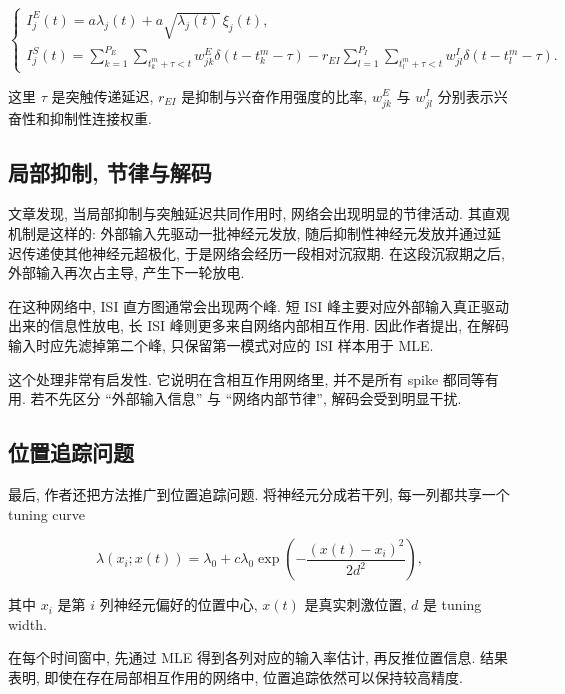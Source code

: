 \documentclass[oneside]{ctexart}
\begin{document}
\begin{equation}
    \begin{cases}
        I_j^{E}(t)=a\lambda_j(t)+a\sqrt{\lambda_j(t)}\,\xi_j(t), \\[1.2ex]
        I_j^{S}(t)=
        \sum\limits_{k=1}^{P_E}\sum\limits_{t_k^m+\tau<t}w_{jk}^{E}\delta(t-t_k^m-\tau)
        -
        r_{EI}\sum\limits_{l=1}^{P_I}\sum\limits_{t_l^m+\tau<t}w_{jl}^{I}\delta(t-t_l^m-\tau).
    \end{cases}
\end{equation}

这里 $\tau$ 是突触传递延迟, $r_{EI}$ 是抑制与兴奋作用强度的比率, $w_{jk}^{E}$ 与 $w_{jl}^{I}$ 分别表示兴奋性和抑制性连接权重.

\subsection{局部抑制, 节律与解码}

文章发现, 当局部抑制与突触延迟共同作用时, 网络会出现明显的节律活动. 其直观机制是这样的: 外部输入先驱动一批神经元发放, 随后抑制性神经元发放并通过延迟传递使其他神经元超极化, 于是网络会经历一段相对沉寂期. 在这段沉寂期之后, 外部输入再次占主导, 产生下一轮放电.

在这种网络中, ISI 直方图通常会出现两个峰. 短 ISI 峰主要对应外部输入真正驱动出来的信息性放电, 长 ISI 峰则更多来自网络内部相互作用. 因此作者提出, 在解码输入时应先滤掉第二个峰, 只保留第一模式对应的 ISI 样本用于 MLE.

这个处理非常有启发性. 它说明在含相互作用网络里, 并不是所有 spike 都同等有用. 若不先区分 ``外部输入信息'' 与 ``网络内部节律'', 解码会受到明显干扰.

\subsection{位置追踪问题}

最后, 作者还把方法推广到位置追踪问题. 将神经元分成若干列, 每一列都共享一个 tuning curve

\begin{equation}
    \lambda(x_i;x(t))
    =
    \lambda_0
    +
    c\lambda_0
    \exp\left(
    -\dfrac{(x(t)-x_i)^2}{2d^2}
    \right),
\end{equation}

其中 $x_i$ 是第 $i$ 列神经元偏好的位置中心, $x(t)$ 是真实刺激位置, $d$ 是 tuning width.

在每个时间窗中, 先通过 MLE 得到各列对应的输入率估计, 再反推位置信息. 结果表明, 即使在存在局部相互作用的网络中, 位置追踪依然可以保持较高精度.
\end{document}
